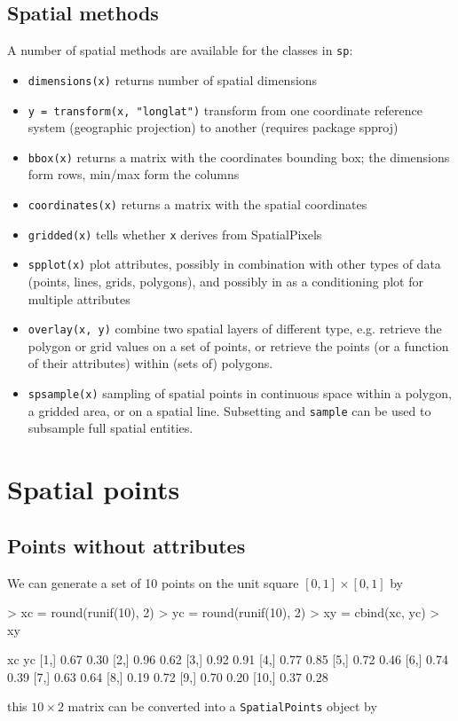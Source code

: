 \documentclass{article}
\begin{document}
\subsection{Spatial methods}
A number of spatial methods are available for the classes in {\tt sp}:
\begin{itemize}
\item {\tt dimensions(x)} returns number of spatial dimensions
\item {\tt y = transform(x, "longlat")} transform from one coordinate
reference system (geographic projection) to another (requires package
spproj)
\item {\tt bbox(x)} returns a matrix with the coordinates bounding box;
the dimensions form rows, min/max form the columns
\item {\tt coordinates(x)} returns a matrix with the spatial coordinates 
\item {\tt gridded(x)} tells whether {\tt x} derives from SpatialPixels
\item {\tt spplot(x)} plot attributes, possibly in combination with
other types of data (points, lines, grids, polygons), and possibly in
as a conditioning plot for multiple attributes
\item {\tt overlay(x, y)} combine two spatial layers of different type,
e.g. retrieve the polygon or grid values on a set of points, or retrieve the
points (or a function of their attributes) within (sets of) polygons.
\item {\tt spsample(x)} sampling of spatial points in continuous space 
within a polygon, a gridded area, or on a spatial line. Subsetting
and {\tt sample} can be used to subsample full spatial entities.
\end{itemize}

\section{Spatial points}

\subsection{Points without attributes}

We can generate a set of 10 points on the unit square $[0,1] \times
[0,1]$ by
\begin{Schunk}
\begin{Sinput}
> xc = round(runif(10), 2)
> yc = round(runif(10), 2)
> xy = cbind(xc, yc)
> xy
\end{Sinput}
\begin{Soutput}
        xc   yc
 [1,] 0.67 0.30
 [2,] 0.96 0.62
 [3,] 0.92 0.91
 [4,] 0.77 0.85
 [5,] 0.72 0.46
 [6,] 0.74 0.39
 [7,] 0.63 0.64
 [8,] 0.19 0.72
 [9,] 0.70 0.20
[10,] 0.37 0.28
\end{Soutput}
\end{Schunk}
this $10 \times 2$ matrix can be converted into a {\tt SpatialPoints}
object by
\end{document}
